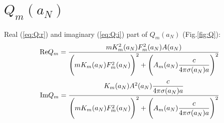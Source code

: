 \documentclass[11pt,oneside,a4paper,notitlepage]{article}
\begin{document}
\section{$Q_m(a_N)$}
Real (\ref{eq:Q:r}) and imaginary (\ref{eq:Q:i}) part of $Q_m(a_N)$ (Fig.\ref{fig:Q}):
\begin{equation}\label{eq:Q:r}
 \textnormal{Re}Q_m=\frac{mK_m^2(a_N)F_m^2(a_N)A(a_N)}{\\
 \Bigg(mK_m(a_N)F_m^2(a_N)\Bigg)^2+\Bigg(A_m(a_N)\dfrac{c}{4\pi\sigma(a_N)a}\Bigg)^2}
\end{equation}
\begin{equation}\label{eq:Q:i}
 \textnormal{Im}Q_m=\frac{K_m(a_N)A^2(a_N)\dfrac{c}{4\pi\sigma(a_N)a} }{\\
 \Bigg(mK_m(a_N)F_m^2(a_N)\Bigg)^2+\Bigg(A_m(a_N)\dfrac{c}{4\pi\sigma(a_N)a}\Bigg)^2}
\end{equation}
\end{document}
